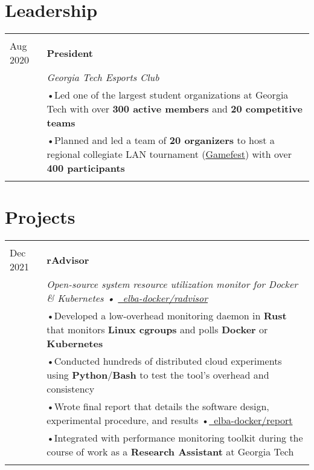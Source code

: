 \documentclass[a4paper,11pt]{article}
\newenvironment{rsection}[1]
  {
    \section{#1}
    \begin{tabular}{>{\raggedleft\arraybackslash}p{\lcolwidth}|p{\rcolwidth}}
   } {
    \\\multicolumn{2}{c}{} \\[-10pt]
    \end{tabular}
  }
\newcommand{\rheader}[2]{
    \multirow[t]{2}{*}{
        \begin{minipage}[t]{\dimexpr \lcolwidth - 0.1cm}
            \begin{flushright}
                \textsc{#1}
            \end{flushright}
        \end{minipage}
    } & \textbf{#2}
}
\newcommand{\rdesc}[1]{
  \\[-2pt]&\small{\emph{#1}\vspace{1pt} }
}
\newcommand{\ritem}[2][ •\hspace{3pt}]{\\[-2pt]& \footnotesize{#1#2}}
\newcommand{\rdot}{\xspace\hspace{0pt}•\hspace{3pt}\xspace}
\begin{document}
\begin{rsection}{Leadership}
  \rheader{July 2019 -\\[-1pt] Aug 2020}{President}
  \rdesc{Georgia Tech Esports Club}
  \ritem{Led one of the largest student organizations at Georgia Tech
    with over \textbf{300 active members} and \textbf{20 competitive teams}}
  \ritem{Planned and led a team of \textbf{20 organizers} to host a regional
    collegiate LAN tournament
    (\href{https://web.archive.org/web/20201111230854/https://gamefest.gg/}{Gamefest})
    with over \textbf{400 participants}}
\end{rsection}
\vspace{\sectionvspace}


\begin{rsection}{Projects}
  \rheader{Feb 2020 -\\[-1pt] Dec 2021}{rAdvisor}
  \rdesc{Open-source system resource utilization monitor for Docker \& Kubernetes
    {\normalfont \rdot
    \href{https://github.com/elba-docker/radvisor}{\faGithub\ elba-docker/radvisor}}}
  \ritem{Developed a low-overhead monitoring daemon in \textbf{Rust}
    that monitors \textbf{Linux cgroups} and polls \textbf{Docker} or \textbf{Kubernetes}}
  \ritem{Conducted hundreds of distributed cloud experiments
    using \textbf{Python}/\textbf{Bash} to test the tool's overhead and consistency}
  \ritem{Wrote final report that details the software design, experimental procedure, and results
    \rdot \href{https://github.com/elba-docker/report}{\faGithub\ elba-docker/report}}
  \ritem{Integrated with performance monitoring toolkit during the course of work
    as a \textbf{Research Assistant} at Georgia Tech}
\end{rsection}
\end{document}
